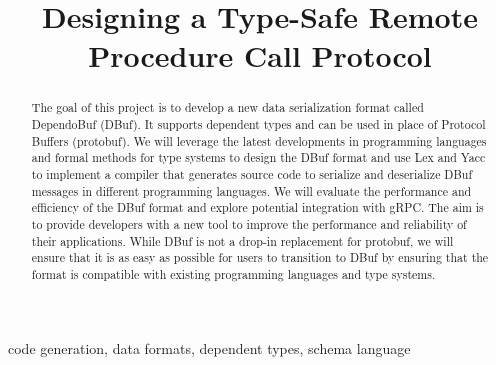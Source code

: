 \documentclass[conference]{IEEEtran}
\begin{document}
\title{Designing a Type-Safe Remote Procedure Call Protocol\\
}

\author{
}

\maketitle

\begin{abstract}
The goal of this project is to develop a new data serialization format called DependoBuf (DBuf). It supports dependent types and can be used in place of Protocol Buffers (protobuf). We will leverage the latest developments in programming languages and formal methods for type systems to design the DBuf format and use Lex and Yacc to implement a compiler that generates source code to serialize and deserialize DBuf messages in different programming languages. We will evaluate the performance and efficiency of the DBuf format and explore potential integration with gRPC. The aim is to provide developers with a new tool to improve the performance and reliability of their applications. While DBuf is not a drop-in replacement for protobuf, we will ensure that it is as easy as possible for users to transition to DBuf by ensuring that the format is compatible with existing programming languages and type systems.
\end{abstract}

\begin{IEEEkeywords}
  code generation, data formats, dependent types, schema language
\end{IEEEkeywords}

\end{document}
